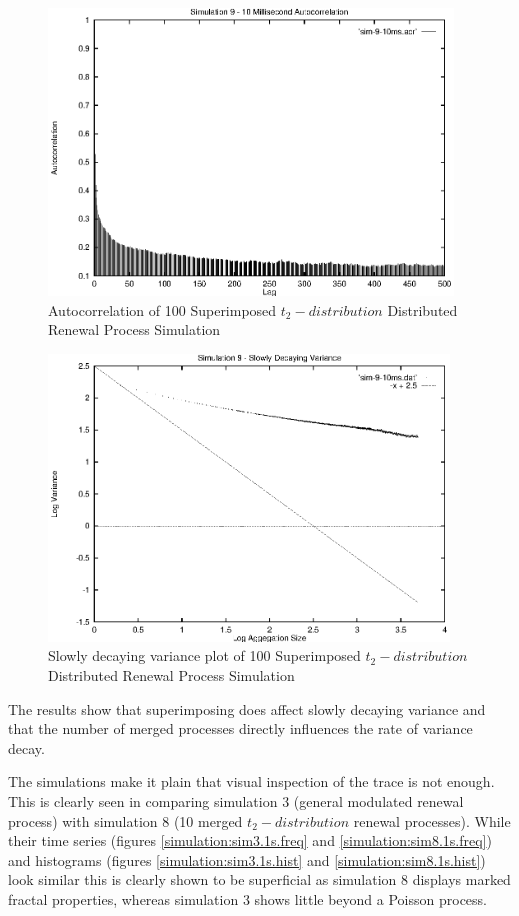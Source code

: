 \begin{figure}
\includegraphics[height=3in]{pics/sim-9-10ms-acr.eps}
\caption{Autocorrelation of 100 Superimposed $t_2-distribution$ Distributed Renewal Process Simulation}
\label{simulation:sim9.10ms.acr}
\end{figure}

\begin{figure}
\includegraphics[height=3in]{pics/sim-9-10ms-sta.eps}
\caption{Slowly decaying variance plot of 100 Superimposed $t_2-distribution$ Distributed Renewal Process Simulation}
\label{simulation:sim9.10ms.sta}
\end{figure}

The results show that superimposing does affect slowly decaying
variance and that the number of merged processes directly influences
the rate of variance decay.

The simulations make it plain that visual inspection of the trace is
not enough.  This is clearly seen in comparing simulation 3 (general
modulated renewal process) with simulation 8 (10 merged
$t_2-distribution$ renewal processes).  While their time series
(figures
\ref{simulation:sim3.1s.freq} and \ref{simulation:sim8.1s.freq}) and
histograms (figures \ref{simulation:sim3.1s.hist} and
\ref{simulation:sim8.1s.hist}) look similar this is clearly shown to be
superficial as simulation 8 displays marked fractal properties,
whereas simulation 3 shows little beyond a Poisson process.

